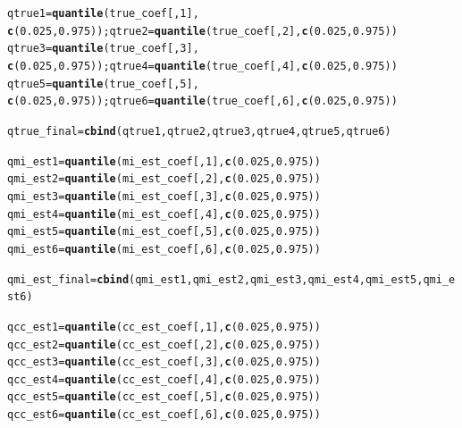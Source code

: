 \documentclass[fleqn,10pt]{wlscirep}\usepackage[]{graphicx}\usepackage[]{color}
\makeatletter
\newcommand{\hlnum}[1]{\textcolor[rgb]{0.686,0.059,0.569}{#1}}%
\newcommand{\hlstd}[1]{\textcolor[rgb]{0.345,0.345,0.345}{#1}}%
\newcommand{\hlkwb}[1]{\textcolor[rgb]{0.69,0.353,0.396}{#1}}%
\newcommand{\hlkwd}[1]{\textcolor[rgb]{0.737,0.353,0.396}{\textbf{#1}}}%
\newenvironment{kframe}{%
 \def\at@end@of@kframe{}%
 \ifinner\ifhmode%
  \def\at@end@of@kframe{\end{minipage}}%
  \begin{minipage}{\columnwidth}%
 \fi\fi%
 \def\FrameCommand##1{\hskip\@totalleftmargin \hskip-\fboxsep
 \colorbox{shadecolor}{##1}\hskip-\fboxsep
     \hskip-\linewidth \hskip-\@totalleftmargin \hskip\columnwidth}%
 \MakeFramed {\advance\hsize-\width
   \@totalleftmargin\z@ \linewidth\hsize
   \@setminipage}}%
 {\par\unskip\endMakeFramed%
 \at@end@of@kframe}
\newenvironment{knitrout}{}{} %
\makeatother
\begin{document}
\begin{knitrout}
\begin{kframe}
\begin{alltt}
    \hlstd{qtrue1} \hlkwb{=} \hlkwd{quantile}\hlstd{(true_coef[,}\hlnum{1}\hlstd{],}
                      \hlkwd{c}\hlstd{(}\hlnum{0.025}\hlstd{,} \hlnum{0.975}\hlstd{)); qtrue2} \hlkwb{=} \hlkwd{quantile}\hlstd{(true_coef[,}\hlnum{2}\hlstd{],} \hlkwd{c}\hlstd{(}\hlnum{0.025}\hlstd{,} \hlnum{0.975}\hlstd{))}
    \hlstd{qtrue3} \hlkwb{=} \hlkwd{quantile}\hlstd{(true_coef[,}\hlnum{3}\hlstd{],}
                      \hlkwd{c}\hlstd{(}\hlnum{0.025}\hlstd{,} \hlnum{0.975}\hlstd{)); qtrue4} \hlkwb{=} \hlkwd{quantile}\hlstd{(true_coef[,}\hlnum{4}\hlstd{],} \hlkwd{c}\hlstd{(}\hlnum{0.025}\hlstd{,} \hlnum{0.975}\hlstd{))}
    \hlstd{qtrue5} \hlkwb{=} \hlkwd{quantile}\hlstd{(true_coef[,}\hlnum{5}\hlstd{],}
                      \hlkwd{c}\hlstd{(}\hlnum{0.025}\hlstd{,} \hlnum{0.975}\hlstd{)); qtrue6} \hlkwb{=} \hlkwd{quantile}\hlstd{(true_coef[,}\hlnum{6}\hlstd{],} \hlkwd{c}\hlstd{(}\hlnum{0.025}\hlstd{,} \hlnum{0.975}\hlstd{))}

    \hlstd{qtrue_final} \hlkwb{=} \hlkwd{cbind}\hlstd{(qtrue1, qtrue2, qtrue3, qtrue4, qtrue5, qtrue6)}

    \hlstd{qmi_est1} \hlkwb{=} \hlkwd{quantile}\hlstd{(mi_est_coef[,}\hlnum{1}\hlstd{],} \hlkwd{c}\hlstd{(}\hlnum{0.025}\hlstd{,} \hlnum{0.975}\hlstd{))}
    \hlstd{qmi_est2} \hlkwb{=} \hlkwd{quantile}\hlstd{(mi_est_coef[,}\hlnum{2}\hlstd{],} \hlkwd{c}\hlstd{(}\hlnum{0.025}\hlstd{,} \hlnum{0.975}\hlstd{))}
    \hlstd{qmi_est3} \hlkwb{=} \hlkwd{quantile}\hlstd{(mi_est_coef[,}\hlnum{3}\hlstd{],} \hlkwd{c}\hlstd{(}\hlnum{0.025}\hlstd{,} \hlnum{0.975}\hlstd{))}
    \hlstd{qmi_est4} \hlkwb{=} \hlkwd{quantile}\hlstd{(mi_est_coef[,}\hlnum{4}\hlstd{],} \hlkwd{c}\hlstd{(}\hlnum{0.025}\hlstd{,} \hlnum{0.975}\hlstd{))}
    \hlstd{qmi_est5} \hlkwb{=} \hlkwd{quantile}\hlstd{(mi_est_coef[,}\hlnum{5}\hlstd{],} \hlkwd{c}\hlstd{(}\hlnum{0.025}\hlstd{,} \hlnum{0.975}\hlstd{))}
    \hlstd{qmi_est6} \hlkwb{=} \hlkwd{quantile}\hlstd{(mi_est_coef[,}\hlnum{6}\hlstd{],} \hlkwd{c}\hlstd{(}\hlnum{0.025}\hlstd{,} \hlnum{0.975}\hlstd{))}

    \hlstd{qmi_est_final} \hlkwb{=} \hlkwd{cbind}\hlstd{(qmi_est1, qmi_est2, qmi_est3, qmi_est4, qmi_est5, qmi_est6)}

    \hlstd{qcc_est1} \hlkwb{=} \hlkwd{quantile}\hlstd{(cc_est_coef[,}\hlnum{1}\hlstd{],} \hlkwd{c}\hlstd{(}\hlnum{0.025}\hlstd{,} \hlnum{0.975}\hlstd{))}
    \hlstd{qcc_est2} \hlkwb{=} \hlkwd{quantile}\hlstd{(cc_est_coef[,}\hlnum{2}\hlstd{],} \hlkwd{c}\hlstd{(}\hlnum{0.025}\hlstd{,} \hlnum{0.975}\hlstd{))}
    \hlstd{qcc_est3} \hlkwb{=} \hlkwd{quantile}\hlstd{(cc_est_coef[,}\hlnum{3}\hlstd{],} \hlkwd{c}\hlstd{(}\hlnum{0.025}\hlstd{,} \hlnum{0.975}\hlstd{))}
    \hlstd{qcc_est4} \hlkwb{=} \hlkwd{quantile}\hlstd{(cc_est_coef[,}\hlnum{4}\hlstd{],} \hlkwd{c}\hlstd{(}\hlnum{0.025}\hlstd{,} \hlnum{0.975}\hlstd{))}
    \hlstd{qcc_est5} \hlkwb{=} \hlkwd{quantile}\hlstd{(cc_est_coef[,}\hlnum{5}\hlstd{],} \hlkwd{c}\hlstd{(}\hlnum{0.025}\hlstd{,} \hlnum{0.975}\hlstd{))}
    \hlstd{qcc_est6} \hlkwb{=} \hlkwd{quantile}\hlstd{(cc_est_coef[,}\hlnum{6}\hlstd{],} \hlkwd{c}\hlstd{(}\hlnum{0.025}\hlstd{,} \hlnum{0.975}\hlstd{))}


\end{alltt}
\end{kframe}
\end{knitrout}
\end{document}
